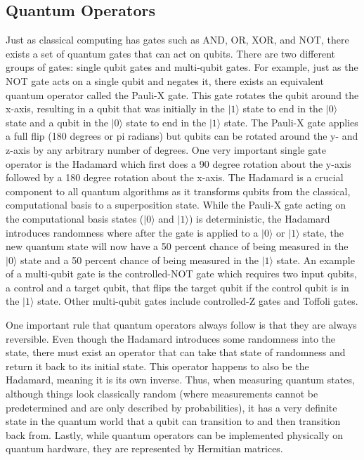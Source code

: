 \documentclass[
	a4paper, %
	10pt, %
	unnumberedsections, %
	twoside, %
]{LTJournalArticle}
\newcommand{\ket}[1]{\lvert#1\rangle} %
\begin{document}
\subsection{Quantum Operators}
Just as classical computing has gates such as AND, OR, XOR, and NOT, there exists a set of quantum gates that can act on qubits. There are two different groups of gates: single 
qubit gates and multi-qubit gates. For example, just as the NOT gate acts on a single qubit and negates it, there exists an equivalent quantum operator called the Pauli-X gate. 
This gate rotates the qubit around the x-axis, resulting in a qubit that was initially in the $\ket{1}$ state to end in the $\ket{0}$ state and a qubit in the $\ket{0}$ state 
to end in the $\ket{1}$ state. The Pauli-X gate applies a full flip (180 degrees or pi radians) but qubits can be rotated around the y- and z-axis by any arbitrary number of degrees. 
One very important single gate operator is the Hadamard which first does a 90 degree rotation about the y-axis followed by a 180 degree rotation about the x-axis. The Hadamard is 
a crucial component to all quantum algorithms as it transforms qubits from the classical, computational basis to a superposition state. While the Pauli-X gate acting on the 
computational basis states ($\ket{0}$ and $\ket{1}$) is deterministic, the Hadamard introduces randomness where after the gate is applied to a $\ket{0}$ or $\ket{1}$ state, the new 
quantum state will now have a 50 percent chance of being measured in the $\ket{0}$ state and a 50 percent chance of being measured in the $\ket{1}$ state. An example of a 
multi-qubit gate is the controlled-NOT gate which requires two input qubits, a control and a target qubit, that flips the target qubit if the control qubit is in the $\ket{1}$ state. 
Other multi-qubit gates include controlled-Z gates and Toffoli gates.

One important rule that quantum operators always follow is that they are always reversible. Even though the Hadamard introduces some randomness into the state, there must exist an 
operator that can take that state of randomness and return it back to its initial state. This operator happens to also be the Hadamard, meaning it is its own inverse. Thus, when 
measuring quantum states, although things look classically random (where measurements cannot be predetermined and are only described by probabilities), it has a very definite state 
in the quantum world that a qubit can transition to and then transition back from. Lastly, while quantum operators can be implemented physically on quantum hardware, they are 
represented by Hermitian matrices.
\end{document}
